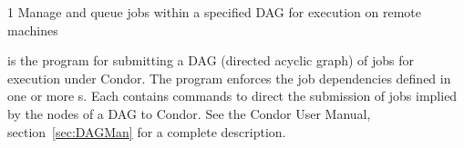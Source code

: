 \begin{ManPage}{\label{man-condor-submit-dag}}{1}
{Manage and queue jobs within a specified DAG for execution on remote machines}
\Synopsis {}



\Description

 is the program for submitting a DAG (directed
acyclic graph) of jobs for execution under Condor.
The program enforces the job dependencies defined
in one or more s.
Each  contains commands
to direct the submission of jobs implied by the nodes
of a DAG to Condor.
See the Condor User Manual, section~\ref{sec:DAGMan} for a complete
description.


\end{ManPage}

